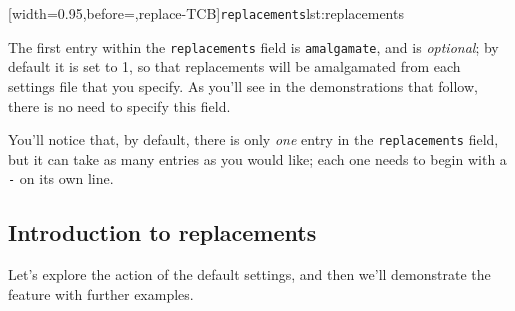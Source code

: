  [width=0.95\linewidth,before=\centering,replace-TCB]{\texttt{replacements}}{lst:replacements}

 The first entry within the \texttt{replacements} field is \texttt{amalgamate}, and is
 \emph{optional}; by default it is set to 1, so that replacements will be amalgamated
 from each settings file that you specify. As you'll see in the demonstrations that
 follow, there is no need to specify this field.

 You'll notice that, by default, there is only \emph{one} entry in the
 \texttt{replacements} field, but it can take as many entries as you would like; each one
 needs to begin with a \texttt{-} on its own line.

\subsection{Introduction to replacements}
 Let's explore the action of the default settings, and then we'll demonstrate the feature
 with further examples.


